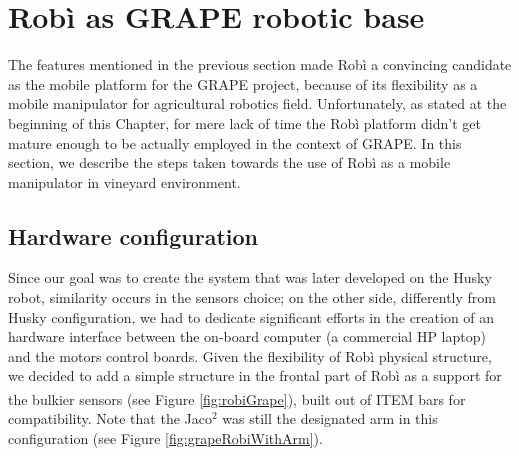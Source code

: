 \section{Robì as GRAPE robotic base}
The features mentioned in the previous section made Robì a convincing candidate as the mobile platform for the \ac{GRAPE} project, because of its flexibility as a mobile manipulator for agricultural robotics field. Unfortunately, as stated at the beginning of this Chapter, for mere lack of time the Robì platform didn't get mature enough to be actually employed in the context of \ac{GRAPE}. In this section, we describe the steps taken towards the use of Robì as a mobile manipulator in vineyard environment.

\subsection{Hardware configuration}
Since our goal was to create the system that was later developed on the Husky robot, similarity occurs in the sensors choice; on the other side, differently from Husky configuration, we had to dedicate significant efforts in the creation of an hardware interface between the on-board computer (a commercial HP laptop) and the motors control boards. Given the flexibility of Robì physical structure, we decided to add a simple structure in the frontal part of Robì as a support for the bulkier sensors (see Figure \ref{fig:robiGrape}), built out of ITEM\textsuperscript{\textregistered} bars for compatibility. Note that the Jaco$^2$ was still the designated arm in this configuration (see Figure \ref{fig:grapeRobiWithArm}).
